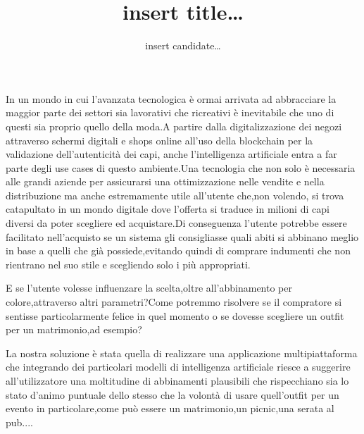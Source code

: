 \documentclass[a4paper,oneside]{Tptesi2}
\title{insert title\ldots}
\author{insert candidate\ldots}
\begin{document}
\frontmatter

%
\pagestyle{headings} %
%
\maketitle %
%
%
\tableofcontents %
\cleardoublepage
%
%

{}
%
\frontmatter

In un mondo in cui l'avanzata tecnologica è ormai arrivata ad abbracciare la maggior parte dei settori sia lavorativi che ricreativi è inevitabile che uno di questi sia proprio quello della moda.A partire dalla digitalizzazione dei negozi attraverso schermi digitali e shops online all'uso della blockchain per la validazione dell'autenticità dei capi, anche l'intelligenza artificiale entra a far parte degli use cases di questo ambiente.Una tecnologia che non solo è necessaria alle grandi aziende per assicurarsi una ottimizzazione nelle vendite e nella distribuzione ma anche estremamente utile all'utente che,non volendo, si trova catapultato in un mondo digitale dove l'offerta si traduce in milioni di capi diversi da poter scegliere ed acquistare.Di conseguenza l'utente potrebbe essere facilitato nell'acquisto se un sistema gli consigliasse quali abiti si abbinano meglio in base a quelli che già possiede,evitando quindi di comprare indumenti che non rientrano nel suo stile e scegliendo solo i più appropriati.

E se l'utente volesse influenzare la scelta,oltre all'abbinamento per colore,attraverso altri parametri?Come potremmo risolvere se il compratore si sentisse particolarmente felice in quel momento o se dovesse scegliere un outfit per un matrimonio,ad esempio?

La nostra soluzione è stata quella di realizzare una applicazione multipiattaforma che integrando dei particolari modelli di intelligenza artificiale riesce a suggerire all'utilizzatore una moltitudine di abbinamenti plausibili che rispecchiano sia lo stato d'animo puntuale dello stesso che la volontà di usare quell'outfit per un evento in particolare,come può essere un matrimonio,un picnic,una serata al pub....
\end{document}
